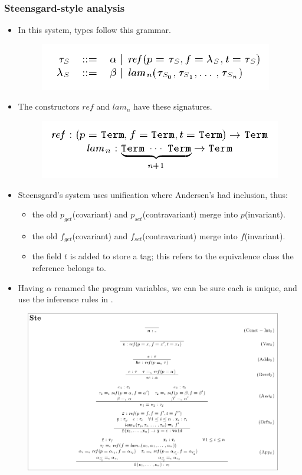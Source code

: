 \documentclass{beamer}
\begin{document}
\begin{frame}[allowframebreaks]
  \frametitle{Steensgard-style analysis}

  \begin{itemize}
  \item In this system, types follow this grammar.
    \begin{figure}
      \centering
      \includegraphics[scale=0.3]{steensgard_type_grammar.png}
    \end{figure}
  \item The constructors $ref$ and $lam_n$ have these signatures.
    \begin{figure}
      \centering
      \includegraphics[scale=0.3]{steensgard_constructor_signatures.png}
    \end{figure}
  \item Steensgard's system uses unification where Andersen's had
    inclusion, thus: 
    \begin{itemize}
    \item the old $p_{get}$(covariant) and $p_{set}$(contravariant)
      merge into $p$(invariant).
    \item the old $f_{get}$(covariant) and $f_{set}$(contravariant)
      merge into $f$(invariant).
    \item the field $t$ is added to store a tag; this refers to the
      equivalence class the reference belongs to.
    \end{itemize}
  \item Having $\alpha$ renamed the program variables, we can be sure
    each is unique, and use the inference rules in .
  \end{itemize}

  \begin{figure}
    \centering
    \includegraphics[scale=0.3]{steensgard_inference_rules.png}
  \end{figure}


\end{frame}
\end{document}

